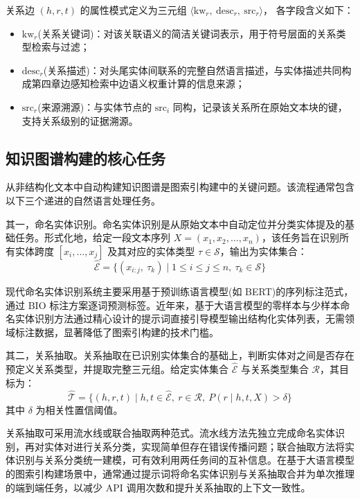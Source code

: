 \documentclass[promaster, vlined]{DissertUESTC}
\begin{document}
关系边 $(h, r, t)$ 的属性模式定义为三元组
$\langle \text{kw}_{r},\ \text{desc}_{r},\ \text{src}_{r} \rangle$，
各字段含义如下：

\begin{itemize}
    \item $\text{kw}_{r}$(关系关键词)：对该关联语义的简洁关键词表示，用于符号层面的关系类型检索与过滤；
    \item $\text{desc}_{r}$(关系描述)：对头尾实体间联系的完整自然语言描述，与实体描述共同构成第四章边感知检索中边语义权重计算的信息来源；
    \item $\text{src}_{r}$(来源溯源)：与实体节点的 $\text{src}_i$ 同构，记录该关系所在原始文本块的键，支持关系级别的证据溯源。
\end{itemize}

\subsection{知识图谱构建的核心任务}

从非结构化文本中自动构建知识图谱是图索引构建中的关键问题。该流程通常包含以下三个递进的自然语言处理任务。

其一，命名实体识别。命名实体识别是从原始文本中自动定位并分类实体提及的基础任务\cite{al2020named}。形式化地，给定一段文本序列 $X = (x_1, x_2, \dots, x_n)$，该任务旨在识别所有实体跨度 $[x_i, \dots, x_j]$ 及其对应的实体类型 $\tau \in \mathcal{S}$，输出为实体集合：
\begin{equation}
\hat{\mathcal{E}} = \{(x_{i:j},\ \tau_k) \mid 1 \le i \le j \le n,\ \tau_k \in \mathcal{S}\}
\end{equation}

现代命名实体识别系统主要采用基于预训练语言模型(如 BERT)的序列标注范式，通过 BIO 标注方案逐词预测标签。近年来，基于大语言模型的零样本与少样本命名实体识别方法通过精心设计的提示词直接引导模型输出结构化实体列表，无需领域标注数据，显著降低了图索引构建的技术门槛\cite{edge2024local}。

其二，关系抽取。关系抽取在已识别实体集合的基础上，判断实体对之间是否存在预定义关系类型，并提取完整三元组。给定实体集合 $\hat{\mathcal{E}}$ 与关系类型集合 $\mathcal{R}$，其目标为：
\begin{equation}
\hat{\mathcal{T}} = \{(h, r, t) \mid h, t \in \hat{\mathcal{E}},\ r \in \mathcal{R},\ P(r \mid h, t, X) > \delta\}
\end{equation}
其中 $\delta$ 为相关性置信阈值。

关系抽取可采用流水线或联合抽取两种范式。流水线方法先独立完成命名实体识别，再对实体对进行关系分类，实现简单但存在错误传播问题；联合抽取方法将实体识别与关系分类统一建模，可有效利用两任务间的互补信息。在基于大语言模型的图索引构建场景中，通常通过提示词将命名实体识别与关系抽取合并为单次推理的端到端任务，以减少 API 调用次数和提升关系抽取的上下文一致性。
\end{document}
